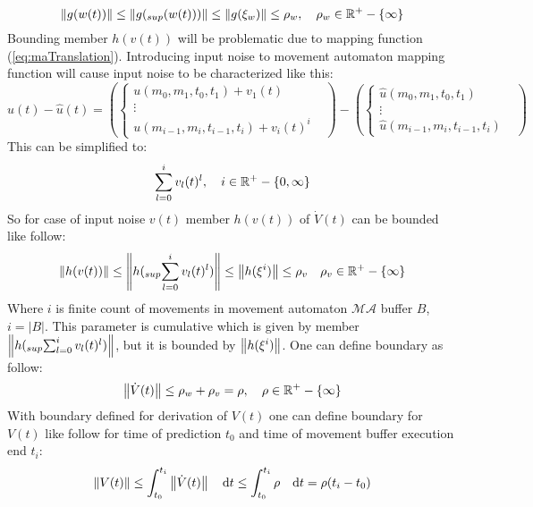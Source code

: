 \begin{dokaz}
\begin{equation}
    \left\lVert g(w(t))\right\rVert \le \left\lVert g(_{sup}(w(t)))\right\rVert \le \left\lVert g(\xi_w)\right\rVert \le \rho_w,\quad \rho_w\in\mathbb{R}^+-\{\infty\}
\end{equation}
\noindent Bounding member $h(v(t))$ will be problematic due to mapping function (\ref{eq:maTranslation}). Introducing input noise to movement automaton mapping function will cause input noise to be characterized like this:
\begin{equation}
    u(t)-\hat{u}(t)=\left(
    \begin{cases}
        u(m_0,m_1,t_0,t_1)+v_1(t)&\\
        \vdots&\\
        u(m_{i-1},m_{i},t_{i-1},t_{i})+v_i(t)^i&
    \end{cases}
    \right) -\left(
    \begin{cases}
        \hat{u}(m_0,m_1,t_0,t_1)&\\
        \vdots&\\
        \hat{u}(m_{i-1},m_{i},t_{i-1},t_{i})&
    \end{cases}
    \right) 
\end{equation}
\noindent This can be simplified to:
\begin{equation}
    \sum_{l=0}^{i} v_l(t)^l, \quad i\in\mathbb{R}^{+}-\{0,\infty\}
\end{equation}
\noindent So for case of input noise $v(t)$ member $h(v(t))$ of $\dot{V}(t)$ can be bounded like follow:
\begin{equation}
    \left\lVert h(v(t))\right\rVert \le \left\lVert h(_{sup}\sum_{l=0}^{i} v_l(t)^l)\right\rVert\le \left\lVert h(\xi^i)\right\rVert \le \rho_v \quad \rho_v\in\mathbb{R}^+-\{\infty\}
\end{equation}
\noindent Where $i$ is finite count of movements in movement automaton $\mathscr{MA}$ buffer $B$, $i=|B|$. This parameter is cumulative which is given by member $\left\lVert h(_{sup}\sum_{l=0}^{i} v_l(t)^l)\right\rVert$, but it is bounded by $\left\lVert h(\xi^i)\right\rVert$. One can define boundary as follow:
\begin{equation}
    \left\lVert\dot{V}(t)\right\rVert \le \rho_w + \rho_v = \rho, \quad \rho\in\mathbb{R}^+-\{\infty\}
\end{equation}
\noindent With boundary defined for derivation of $V(t)$ one can define boundary for $V(t)$ like follow for time of prediction $t_0$ and time of movement buffer execution end $t_i$:
\begin{equation}
    \left\lVert V(t)\right\rVert \le \int_{t_0}^{t_i} \left\lVert\dot{V}(t)\right\rVert\quad \text{d}t \le \int_{t_0}^{t_i} \rho \quad\text{d}t = \rho(t_i-t_0)
\end{equation}
\end{dokaz}
